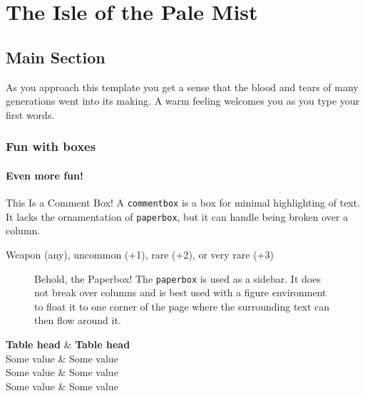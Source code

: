 \documentclass[letterpaper,10pt,twoside,twocolumn,openany]{book}
\begin{document}
	
	
	\chapter{The Isle of the Pale Mist}
	
	\section{Main Section}
	\lipsum[2] %
	
	\begin{quotebox}
		As you approach this template you get a sense that the blood and tears of many generations went into its making. A warm feeling welcomes you as you type your first words.
	\end{quotebox}
	
	\subsection{Fun with boxes}
	\subsubsection{Even more fun!}
	
	\begin{commentbox}{This Is a Comment Box!}
		A \lstinline!commentbox! is a box for minimal highlighting of text. It lacks the ornamentation of \lstinline!paperbox!, but it can handle being broken over a column.
	\end{commentbox}
	
	{Weapon (any), uncommon (+1), rare (+2), or very rare (+3)}
	
	\lipsum[3]
	
	\begin{figure}[!t]
		\begin{paperbox}{Behold, the Paperbox!}
			The \lstinline!paperbox! is used as a sidebar. It does not break over columns and is best used with a figure environment to float it to one corner of the page where the surrounding text can then flow around it.
		\end{paperbox}
	\end{figure}
	
	\begin{dndtable}
		\textbf{Table head}  & \textbf{Table head} \\
		Some value  & Some value \\
		Some value  & Some value \\
		Some value  & Some value
	\end{dndtable}
	
\end{document}
